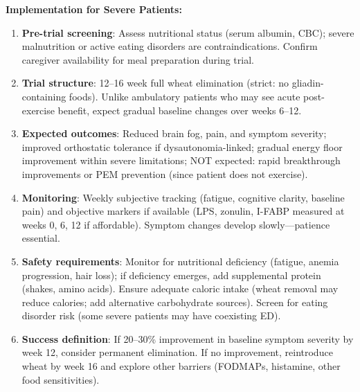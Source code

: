 \begin{recommendation}
\label{rec:wheat-elimination-bedbound}

\textbf{Implementation for Severe Patients:}

\begin{enumerate}
    \item \textbf{Pre-trial screening}: Assess nutritional status (serum albumin, CBC); severe malnutrition or active eating disorders are contraindications. Confirm caregiver availability for meal preparation during trial.

    \item \textbf{Trial structure}: 12--16 week full wheat elimination (strict: no gliadin-containing foods). Unlike ambulatory patients who may see acute post-exercise benefit, expect gradual baseline changes over weeks 6--12.

    \item \textbf{Expected outcomes}: Reduced brain fog, pain, and symptom severity; improved orthostatic tolerance if dysautonomia-linked; gradual energy floor improvement within severe limitations; NOT expected: rapid breakthrough improvements or PEM prevention (since patient does not exercise).

    \item \textbf{Monitoring}: Weekly subjective tracking (fatigue, cognitive clarity, baseline pain) and objective markers if available (LPS, zonulin, I-FABP measured at weeks 0, 6, 12 if affordable). Symptom changes develop slowly---patience essential.

    \item \textbf{Safety requirements}: Monitor for nutritional deficiency (fatigue, anemia progression, hair loss); if deficiency emerges, add supplemental protein (shakes, amino acids). Ensure adequate caloric intake (wheat removal may reduce calories; add alternative carbohydrate sources). Screen for eating disorder risk (some severe patients may have coexisting ED).

    \item \textbf{Success definition}: If 20--30\% improvement in baseline symptom severity by week 12, consider permanent elimination. If no improvement, reintroduce wheat by week 16 and explore other barriers (FODMAPs, histamine, other food sensitivities).
\end{enumerate}

\end{recommendation}

